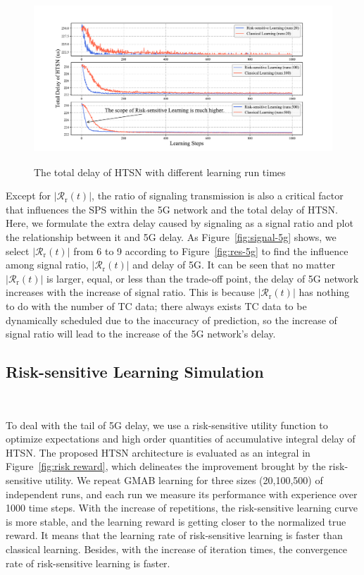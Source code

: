 \documentclass{SCIS2021}
\begin{document}
	\begin{figure}[t]
		\vspace{-0.2cm}
		\centering
		\includegraphics[height=6.3cm, width=13cm]{risk_delay}
		\caption{The total delay of HTSN with different learning run times}
		\label{fig:risk_delay}
	\end{figure}

	\par Except for $\left|\mathcal{R}_\mathrm{r}(t)\right|$, the ratio of signaling transmission is also a critical factor that influences the SPS within the 5G network and the total delay of HTSN. Here, we formulate the extra delay caused by signaling as a signal ratio and plot the relationship between it and 5G delay. As Figure~\ref{fig:signal-5g} shows, we select $\left|\mathcal{R}_\mathrm{r}(t)\right|$ from 6 to 9 according to Figure~\ref{fig:res-5g} to find the influence among signal ratio, $\left|\mathcal{R}_\mathrm{r}(t)\right|$ and delay of 5G. It can be seen that no matter $\left|\mathcal{R}_\mathrm{r}(t)\right|$ is larger, equal, or less than the trade-off point, the delay of 5G network increases with the increase of signal ratio. This is because $\left|\mathcal{R}_\mathrm{r}(t)\right|$ has nothing to do with the number of TC data; there always exists TC data to be dynamically scheduled due to the inaccuracy of prediction, so the increase of signal ratio will lead to the increase of the 5G network's delay.


	\subsection{Risk-sensitive Learning Simulation}~{}
	\par To deal with the tail of 5G delay, we use a risk-sensitive utility function to optimize expectations and high order quantities of accumulative integral delay of HTSN. The proposed HTSN architecture is evaluated as an integral in Figure~\ref{fig:risk reward}, which delineates the improvement brought by the risk-sensitive utility. We repeat GMAB learning for three sizes (20,100,500) of independent runs, and each run we measure its performance with experience over 1000 time steps. With the increase of repetitions, the risk-sensitive learning curve is more stable, and the learning reward is getting closer to the normalized true reward. It means that the learning rate of risk-sensitive learning is faster than classical learning. Besides, with the increase of iteration times, the convergence rate of risk-sensitive learning is faster.
\end{document}
